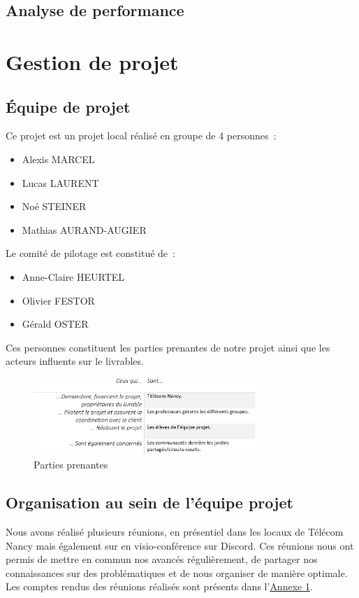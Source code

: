 \documentclass[french,a4paper]{article}
\begin{document}
\subsection{Analyse de performance}
\newpage
\section{Gestion de projet}
\subsection{Équipe de projet}
Ce projet est un projet local réalisé en groupe de 4 personnes~:
\begin{itemize}
    \item Alexis MARCEL
    \item Lucas LAURENT
    \item Noé STEINER
    \item Mathias AURAND-AUGIER
\end{itemize}
Le comité de pilotage est constitué de~:
\begin{itemize}
    \item Anne-Claire HEURTEL
    \item Olivier FESTOR
    \item Gérald OSTER
\end{itemize}
Ces personnes constituent les parties prenantes de notre projet ainsi que les acteurs influents sur le livrables.
\begin{figure}[H]
    \centering
    \includegraphics[width=0.75\textwidth]{img/parties_prenantes.png}
    \caption{Parties prenantes}
\end{figure}
\subsection{Organisation au sein de l’équipe projet}
Nous avons réalisé plusieurs réunions, en présentiel dans les locaux de Télécom Nancy mais également sur en visio-conférence sur Discord. Ces réunions nous ont permis de mettre en commun nos avancés régulièrement, de partager nos connaissances sur des problématiques et de nous organiser de manière optimale.
Les comptes rendus des réunions réalisés sont présents dans l’\hyperlink{annexe1}{Annexe 1}.
\end{document}
